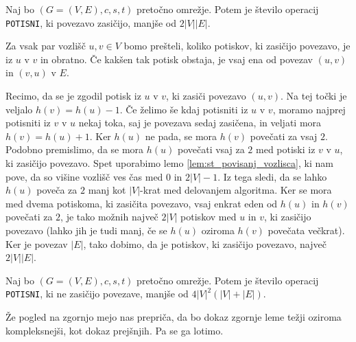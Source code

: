 \documentclass[mat1]{fmfdelo}
\begin{document}
\begin{lema}\label{lem:om_st_op_potisni_nas}
Naj bo $(G=(V,E),c,s,t)$ pretočno omrežje. Potem je število operacij \texttt{POTISNI}, ki povezavo zasičijo, manjše od $2|V||E|$.
\end{lema}

\begin{dokaz}
Za vsak par vozlišč $u,v \in V$ bomo prešteli, koliko potiskov, ki zasičijo povezavo, je iz $u$ v $v$ in obratno. Če kakšen tak potisk obstaja, je vsaj ena od povezav $(u,v)$ in $(v,u)$ v $E$.

Recimo, da se je zgodil potisk iz $u$ v $v$, ki zasiči povezavo $(u,v)$. Na tej točki je veljalo $h(v) = h(u) - 1$. Če želimo še kdaj potisniti iz $u$ v $v$, moramo najprej potisniti iz $v$ v $u$ nekaj toka, saj je povezava sedaj zasičena, in veljati mora $h(v) = h(u) + 1$. Ker $h(u)$ ne pada, se mora $h(v)$ povečati za vsaj $2$. Podobno premislimo, da se mora $h(u)$ povečati vsaj za $2$ med potiski iz $v$ v $u$, ki zasičijo povezavo. Spet uporabimo lemo \ref{lem:st_povisanj_vozlisca}, ki nam pove, da so višine vozlišč ves čas med $0$ in $2|V|-1$. Iz tega sledi, da se lahko $h(u)$ poveča za $2$ manj kot $|V|$-krat med delovanjem algoritma. Ker se mora med dvema potiskoma, ki zasičita povezavo, vsaj enkrat eden od $h(u)$ in $h(v)$ povečati za $2$, je tako možnih največ $2|V|$ potiskov med $u$ in $v$, ki zasičijo povezavo (lahko jih je tudi manj, če se $h(u)$ oziroma $h(v)$ povečata večkrat). Ker je povezav $|E|$, tako dobimo, da je potiskov, ki zasičijo povezavo, največ $2|V||E|$.
\end{dokaz}

\begin{lema} \label{lem:om_st_op_potisni_nezas}
Naj bo $(G=(V,E),c,s,t)$ pretočno omrežje. Potem je število operacij \texttt{POTISNI}, ki ne zasičijo povezave, manjše od $4|V|^2 (|V| + |E|)$.
\end{lema}

Že pogled na zgornjo mejo nas prepriča, da bo dokaz zgornje leme težji oziroma kompleksnejši, kot dokaz prejšnjih. Pa se ga lotimo.
\end{document}
